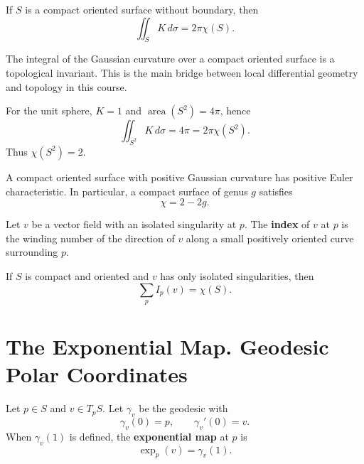 \documentclass[12pt, oneside]{book}
\begin{document}
\begin{corollary}
    If $S$ is a compact oriented surface without boundary, then
    \[
        \iint_S K\,d\sigma=2\pi\chi(S).
    \]
\end{corollary}

\begin{remark}
    The integral of the Gaussian curvature over a compact oriented surface is a
    topological invariant.  This is the main bridge between local differential
    geometry and topology in this course.
\end{remark}

\begin{example}
    For the unit sphere, $K=1$ and $\operatorname{area}(S^2)=4\pi$, hence
    \[
        \iint_{S^2}K\,d\sigma=4\pi=2\pi\chi(S^2).
    \]
    Thus $\chi(S^2)=2$.
\end{example}

\begin{proposition}
    A compact oriented surface with positive Gaussian curvature has positive
    Euler characteristic.  In particular, a compact surface of genus $g$ satisfies
    \[
        \chi=2-2g.
    \]
\end{proposition}

\begin{definition}
    Let $v$ be a vector field with an isolated singularity at $p$.  The
    \textbf{index} of $v$ at $p$ is the winding number of the direction of $v$
    along a small positively oriented curve surrounding $p$.
\end{definition}

\begin{theorem}
    If $S$ is compact and oriented and $v$ has only isolated singularities, then
    \[
        \sum_p I_p(v)=\chi(S).
    \]
\end{theorem}

\section{The Exponential Map. Geodesic Polar Coordinates}

\begin{definition}
    Let $p\in S$ and $v\in T_pS$.  Let $\gamma_v$ be the geodesic with
    \[
        \gamma_v(0)=p,\qquad \gamma_v'(0)=v.
    \]
    When $\gamma_v(1)$ is defined, the \textbf{exponential map} at $p$ is
    \[
        \exp_p(v)=\gamma_v(1).
    \]
\end{definition}
\end{document}
